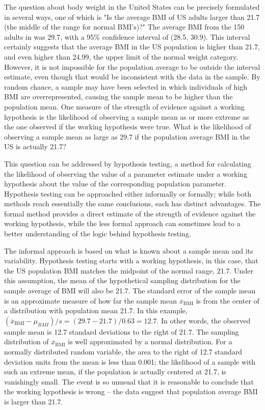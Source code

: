 \begin{spacing}{1.5}
The question about body weight in the United States can be precisely formulated in several ways, one of which is  "Is the average BMI of US adults larger than 21.7 (the middle of the range for normal BMI's)?" The average BMI from the 150 adults in  was 29.7, with a 95\% confidence interval of (28.5, 30.9). This interval certainly suggests that the average BMI in the US population is higher than 21.7, and even higher than 24.99, the upper limit of the normal weight category.  However, it is not impossible for the population average to be outside the interval estimate, even though that would be inconsistent with the data in the sample. By random chance, a sample may have been selected in which individuals of high BMI are overrepresented, causing the sample mean to be higher than the population mean. One measure of the strength of evidence against a working hypothesis is the likelihood of observing a sample mean as or more extreme as the one observed if the working hypothesis were true. What is the likelihood of observing a sample mean as large as 29.7 if the population average BMI in the US is actually 21.7?

This question can be addressed by hypothesis testing, a method for calculating the likelihood of observing the value of a parameter estimate under a working hypothesis about the value of the corresponding population parameter. Hypothesis testing can be approached either informally or formally; while both methods reach essentially  the same conclusions, each has distinct advantages. The formal method provides a direct estimate of the strength of evidence against the working hypothesis, while the less formal approach can sometimes lead to a better understanding of the logic behind hypothesis testing.

The informal approach is based on what is known about a sample mean and its variability. Hypothesis testing starts with a working hypothesis, in this case, that the US population BMI matches the midpoint of the normal range, 21.7. Under this assumption, the mean of the hypothetical sampling distribution for the sample average of BMI will also be 21.7. The standard error of the sample mean is an approximate measure of how far the sample mean $\overline{x}_{\text{BMI}}$ is from the center of a distribution with population mean 21.7. In this example, $(\overline{x}_{\text{BMI}} - \mu_{BMI})/s =  (29.7 - 21.7)/0.63 = 12.7$. In other words, the observed sample mean is 12.7 standard deviations to the right of 21.7. The sampling distribution of $\overline{x}_{\text{BMI}}$ is well approximated by a normal distribution. For a normally distributed random variable, the area to the right of 12.7 standard deviation units from the mean is less than 0.001; the likelihood of a sample with such an extreme mean, if the population is actually centered at 21.7, is vanishingly small. The event is so unusual that it is reasonable to conclude that the working hypothesis is wrong -- the data suggest that population average BMI is larger than 21.7.


\end{spacing}

